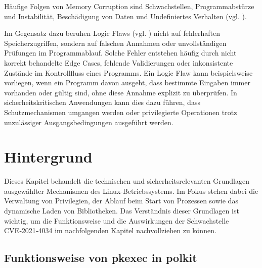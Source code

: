 \documentclass[oneside,11pt,a4paper,article,german]{memoir}
\begin{document}
Häufige Folgen von Memory Corruption sind Schwachstellen, Programmabstürze und Instabilität, Beschädigung von Daten und Undefiniertes Verhalten (vgl. \cite{c1_memory_corruption_stern}).
\par
Im Gegensatz dazu beruhen Logic Flaws (vgl. \cite{c21_logic_flaw_portswigger}) nicht auf fehlerhaften Speicherzugriffen,
sondern auf falschen Annahmen oder unvollständigen Prüfungen im Programmablauf.
Solche Fehler entstehen häufig durch nicht korrekt behandelte Edge Cases, fehlende Validierungen oder inkonsistente Zustände im Kontrollfluss eines Programms.
Ein Logic Flaw kann beispielsweise vorliegen, wenn ein Programm davon ausgeht, dass bestimmte Eingaben immer vorhanden oder gültig sind, ohne diese Annahme
explizit zu überprüfen. In sicherheitskritischen Anwendungen kann dies dazu
führen, dass Schutzmechanismen umgangen werden oder privilegierte Operationen trotz unzulässiger Ausgangsbedingungen ausgeführt werden.
\par

\chapter{Hintergrund}
Dieses Kapitel behandelt die technischen und sicherheitsrelevanten Grundlagen ausgewählter Mechanismen des Linux-Betriebssystems.
Im Fokus stehen dabei die Verwaltung von Privilegien, der Ablauf beim Start von Prozessen sowie das dynamische Laden von Bibliotheken.
Das Verständnis dieser Grundlagen ist wichtig, um die Funktionsweise und die Auswirkungen der Schwachstelle CVE‑2021‑4034 im nachfolgenden Kapitel nachvollziehen zu können.

\section{Funktionsweise von pkexec in polkit}
\end{document}

